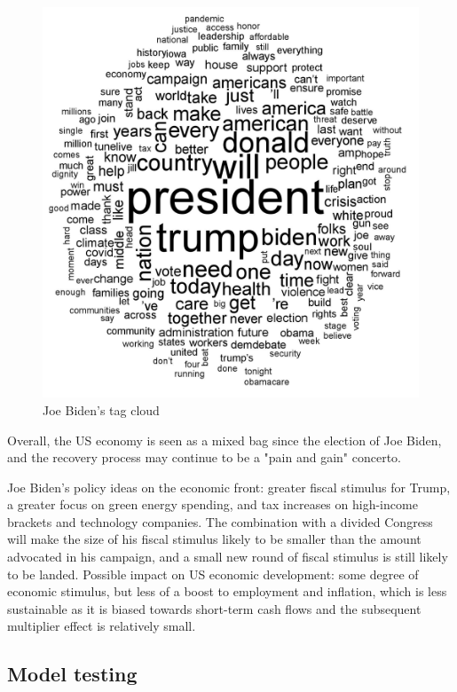 \documentclass{apmcmthesis}
\begin{document}
\begin{figure}[H]
	\centering
	\includegraphics[width=0.9\linewidth]{BT.jpeg}
	\caption{Joe Biden's tag cloud}
\end{figure}

Overall, the US economy is seen as a mixed bag since the election of Joe Biden, and the recovery process may continue to be a "pain and gain" concerto.

Joe Biden's policy ideas on the economic front: greater fiscal stimulus for Trump, a greater focus on green energy spending, and tax increases on high-income brackets and technology companies. The combination with a divided Congress will make the size of his fiscal stimulus likely to be smaller than the amount advocated in his campaign, and a small new round of fiscal stimulus is still likely to be landed. Possible impact on US economic development: some degree of economic stimulus, but less of a boost to employment and inflation, which is less sustainable as it is biased towards short-term cash flows and the subsequent multiplier effect is relatively small.

\subsection{Model testing}
\end{document}
